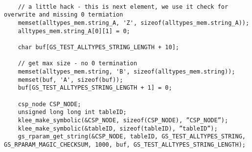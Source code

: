 \begin{lstlisting}[style=CStyle, caption=Test template to enable data-driven mutation testing for libParam, label=GSLtest]

    // a little hack - this is next element, we use it check for overwrite and missing 0 termiation
    memset(alltypes_mem.string_A, 'Z', sizeof(alltypes_mem.string_A));
    alltypes_mem.string_A[0][1] = 0;

    char buf[GS_TEST_ALLTYPES_STRING_LENGTH + 10];

    // get max size - no 0 termination
    memset(alltypes_mem.string, 'B', sizeof(alltypes_mem.string));
    memset(buf, 'A', sizeof(buf));
    buf[GS_TEST_ALLTYPES_STRING_LENGTH + 1] = 0;
    
    csp_node CSP_NODE;
    unsigned long long int tableID;
    klee_make_symbolic(&CSP_NODE, sizeof(CSP_NODE), ”CSP_NODE”);
    klee_make_symbolic(&tableID, sizeof(tableID), ”tableID”);
    gs_rparam_get_string(&CSP_NODE, tableID, GS_TEST_ALLTYPES_STRING, GS_RPARAM_MAGIC_CHECKSUM, 1000, buf, GS_TEST_ALLTYPES_STRING_LENGTH);

    
\end{lstlisting}



%
%
%
